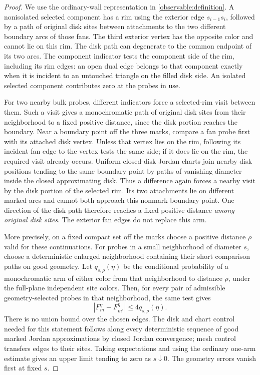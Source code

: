 \begin{proof}
We use the ordinary-wall representation in
\eqref{observable:definition}. A nonisolated selected component has a rim
using the exterior edge $s_{i-1}s_i$, followed by a path of original disk
sites between attachments to the two different boundary arcs of those
fans. The third exterior vertex has the opposite color and cannot lie on
this rim. The disk path can degenerate to the common endpoint of its two
arcs. The component indicator tests the component side of the rim,
including its rim edges: an open dual edge belongs to that component
exactly when it is incident to an untouched triangle on the filled disk
side. An isolated selected component contributes zero at the probes in
use.

For two nearby bulk probes, different indicators force a selected-rim
visit between them. Such a visit gives a monochromatic path of original
disk sites from their neighborhood to a fixed positive distance, since
the disk portion reaches the boundary. Near a boundary point off the
three marks, compare a fan probe first with its attached disk vertex.
Unless that vertex lies on the rim, following its incident fan edge to
the vertex tests the same side; if it does lie on the rim, the required
visit already occurs. Uniform closed-disk Jordan charts join nearby disk
positions tending to the same boundary point by paths of vanishing
diameter inside the closed approximating disk. Thus a difference again
forces a nearby visit by the disk portion of the selected rim. Its two
attachments lie on different marked arcs and cannot both approach this
nonmark boundary point. One direction of the disk path therefore reaches
a fixed positive distance \emph{among original disk sites}. The exterior
fan edges do not replace this arm.

More precisely, on a fixed compact set off the marks choose a positive
distance $\rho$ valid for these continuations. For probes in a small
neighborhood of diameter $s$, choose a deterministic enlarged
neighborhood containing their short comparison paths on good geometry.
Let $q_{s,\rho}(\eta)$ be the conditional probability of a monochromatic
arm of either color from that neighborhood to distance $\rho$, under the
full-plane independent site colors. Then, for every pair of admissible
geometry-selected probes in that neighborhood, the same test gives
\begin{equation}
             |F_m^\eta-F_{m'}^\eta|
                    \le4q_{s,\rho}(\eta).
 \label{observable:conditional-arm}
\end{equation}
There is no union bound over the chosen edges. The disk and chart control
needed for this statement follows along every deterministic sequence of
good marked Jordan approximations by closed Jordan convergence; mesh
control transfers edges to their sites. Taking expectations and using
the ordinary one-arm estimate gives an upper limit tending to zero as
$s\downarrow0$. The geometry errors vanish first at fixed $s$.


\end{proof}
